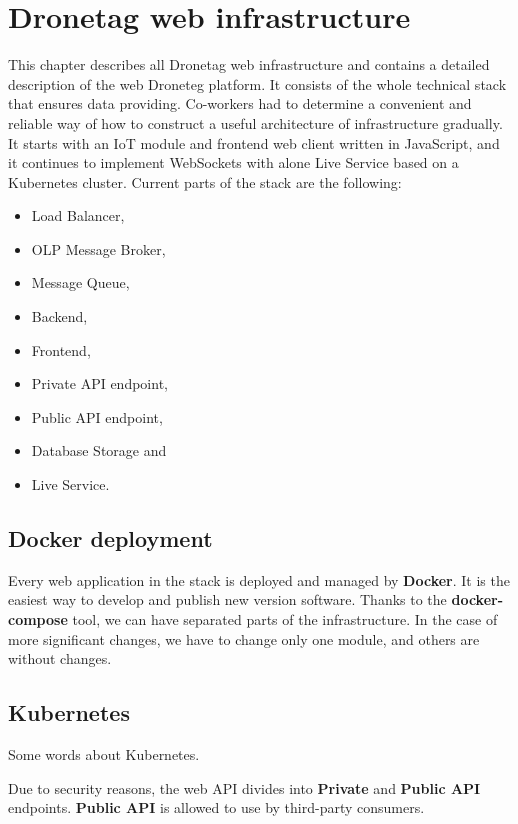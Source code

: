 \chapter{Dronetag web infrastructure}\label{ch:dronetag-web-infrastructure}
This chapter describes all Dronetag web infrastructure and contains a detailed description of the web Droneteg platform.
It consists of the whole technical stack that ensures data providing.
Co-workers had to determine a convenient and reliable way of how to construct a useful architecture of infrastructure gradually.
It starts with an IoT module and frontend web client written in JavaScript, and it continues to implement WebSockets with alone Live Service based on a Kubernetes cluster.
Current parts of the stack are the following:
\begin{itemize}
    \item Load Balancer,
    \item OLP Message Broker,
    \item Message Queue,
    \item Backend,
    \item Frontend,
    \item Private API endpoint,
    \item Public API endpoint,
    \item Database Storage and
    \item Live Service.
\end{itemize}

\section{Docker deployment}\label{sec:docker-deployment}
Every web application in the stack is deployed and managed by \textbf{Docker}. %
It is the easiest way to develop and publish new version software.
Thanks to the \textbf{docker-compose} tool, we can have separated parts of the infrastructure.
In the case of more significant changes, we have to change only one module, and others are without changes.

\section{Kubernetes}\label{sec:kubernetes}
Some words about Kubernetes. %

Due to security reasons, the web API divides into \textbf{Private} and \textbf{Public API} endpoints.
\textbf{Public API} is allowed to use by third-party consumers.

